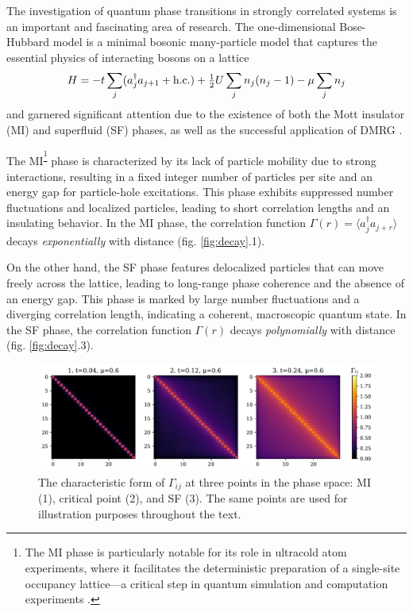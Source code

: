 The investigation of quantum phase transitions in strongly correlated systems is an important and fascinating area of research. The one-dimensional Bose-Hubbard model is a minimal bosonic many-particle model that captures the essential physics of interacting bosons on a lattice \cite{kuehner_phases_1998}
\begin{equation*}
	H = -t \sum_{j} (a_j^{\dag} a_{j+1} + \textnormal{h.c.}) + \tfrac{1}{2}U \sum_j n_j (n_j-1) - \mu \sum_j n_j
\end{equation*}
and garnered significant attention due to the existence of both the Mott insulator (MI) and superfluid (SF) phases, as well as the successful application of DMRG \cite{PhysRevLett.69.2863}.

The MI\textsuperscript{\footnote{
    The MI phase is particularly notable for its role in ultracold atom experiments, where it facilitates the deterministic preparation of a single-site occupancy lattice—a critical step in quantum simulation and computation experiments \cite{choi_exploring_2016}.
}} phase is characterized by its lack of particle mobility due to strong interactions, resulting in a fixed integer number of particles per site and an energy gap for particle-hole excitations. This phase exhibits suppressed number fluctuations and localized particles, leading to short correlation lengths and an insulating behavior. In the MI phase, the correlation function $\Gamma(r) = \langle a_j^\dagger a_{j+r} \rangle$ decays \textit{exponentially} with distance (fig. \ref{fig:decay}.1). 

On the other hand, the SF phase features delocalized particles that can move freely across the lattice, leading to long-range phase coherence and the absence of an energy gap. This phase is marked by large number fluctuations and a diverging correlation length, indicating a coherent, macroscopic quantum state. In the SF phase, the correlation function $\Gamma(r)$ decays \textit{polynomially} with distance (fig. \ref{fig:decay}.3).


\begin{figure}[b]
\includegraphics[width=\linewidth]{imgs/corrs.pdf}
\caption{The characteristic form of $\Gamma_{ij}$ at three points in the phase space: MI (1), critical point (2), and SF (3). The same points are used for illustration purposes throughout the text.}
\label{fig:corrmat}
\end{figure}

